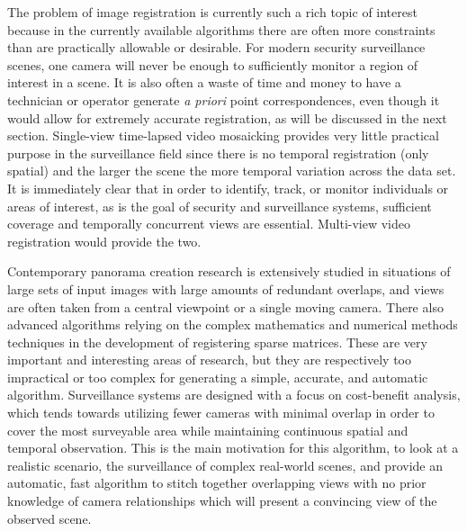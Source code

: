 %
%
%
%
%
%
%

%
%
%


The problem of image registration is currently such a rich topic of interest because in the currently available algorithms there are often more constraints than are practically allowable or desirable. For modern security surveillance scenes, one camera will never be enough to sufficiently monitor a region of interest in a scene. It is also often a waste of time and money to have a technician or operator generate \textit{a priori} point correspondences, even though it would allow for extremely accurate registration, as will be discussed in the next section. Single-view time-lapsed video mosaicking provides very little practical purpose in the surveillance field since there is no temporal registration (only spatial) and the larger the scene the more temporal variation across the data set. It is immediately clear that in order to identify, track, or monitor individuals or areas of interest, as is the goal of security and surveillance systems, sufficient coverage and temporally concurrent views are essential. Multi-view video registration would provide the two.

Contemporary panorama creation research is extensively studied in situations of large sets of input images with large amounts of redundant overlaps, and views are often taken from a central viewpoint or a single moving camera. There also advanced algorithms relying on the complex mathematics and numerical methods techniques in the development of registering sparse matrices. These are very important and interesting areas of research, but they are respectively too impractical or too complex for generating a simple, accurate, and automatic algorithm. Surveillance systems are designed with a focus on cost-benefit analysis, which tends towards utilizing fewer cameras with minimal overlap in order to cover the most surveyable area while maintaining continuous spatial and temporal observation. This is the main motivation for this algorithm, to look at a realistic scenario, the surveillance of complex real-world scenes, and provide an automatic, fast algorithm to stitch together overlapping views with no prior knowledge of camera relationships which will present a convincing view of the observed scene.

